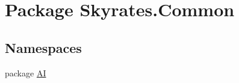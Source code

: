 \hypertarget{namespace_skyrates_1_1_common}{\section{Package Skyrates.\-Common}
\label{namespace_skyrates_1_1_common}
}
\subsection*{Namespaces}
\begin{DoxyCompactItemize}
\item 
package \hyperlink{namespace_skyrates_1_1_common_1_1_a_i}{A\-I}
\end{DoxyCompactItemize}
